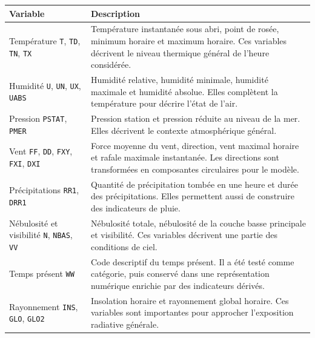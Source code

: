 \documentclass{article}
\begin{document}
\begin{table}[H]
\centering
\renewcommand{\arraystretch}{1.18}
\small
\begin{tabularx}{\textwidth}{p{}Y}
\toprule
\textbf{Variable} & \textbf{Description} \\
\midrule
Température \newline \texttt{T}, \texttt{TD}, \texttt{TN}, \texttt{TX} &
Température instantanée sous abri, point de rosée, minimum horaire et maximum horaire. Ces variables décrivent le niveau thermique général de l'heure considérée. \\
\addlinespace
Humidité \newline \texttt{U}, \texttt{UN}, \texttt{UX}, \texttt{UABS} &
Humidité relative, humidité minimale, humidité maximale et humidité absolue. Elles complètent la température pour décrire l'état de l'air. \\
\addlinespace
Pression \newline \texttt{PSTAT}, \texttt{PMER} &
Pression station et pression réduite au niveau de la mer. Elles décrivent le contexte atmosphérique général. \\
\addlinespace
Vent \newline \texttt{FF}, \texttt{DD}, \texttt{FXY}, \texttt{FXI}, \texttt{DXI} &
Force moyenne du vent, direction, vent maximal horaire et rafale maximale instantanée. Les directions sont transformées en composantes circulaires pour le modèle. \\
\addlinespace
Précipitations \newline \texttt{RR1}, \texttt{DRR1} &
Quantité de précipitation tombée en une heure et durée des précipitations. Elles permettent aussi de construire des indicateurs de pluie. \\
\addlinespace
Nébulosité et visibilité \newline \texttt{N}, \texttt{NBAS}, \texttt{VV} &
Nébulosité totale, nébulosité de la couche basse principale et visibilité. Ces variables décrivent une partie des conditions de ciel. \\
\addlinespace
Temps présent \newline \texttt{WW} &
Code descriptif du temps présent. Il a été testé comme catégorie, puis conservé dans une représentation numérique enrichie par des indicateurs dérivés. \\
\addlinespace
Rayonnement \newline \texttt{INS}, \texttt{GLO}, \texttt{GLO2} &
Insolation horaire et rayonnement global horaire. Ces variables sont importantes pour approcher l'exposition radiative générale. \\

\end{tabularx}
\end{table}
\end{document}
